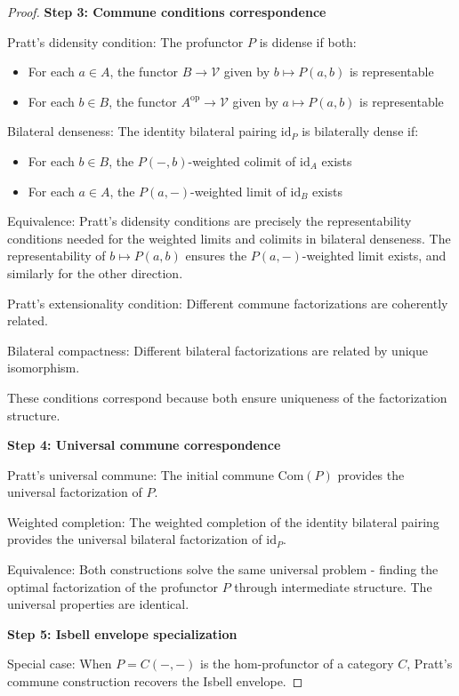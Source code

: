 \documentclass[11pt]{article}
\theoremstyle{plain}
\theoremstyle{definition}
\theoremstyle{remark}
\newcommand{\V}{\mathcal{V}}
\newcommand{\op}{\mathrm{op}}
\begin{document}
\begin{proof}
\textbf{Step 3: Commune conditions correspondence}

Pratt's didensity condition: The profunctor $P$ is didense if both:
\begin{itemize}
\item For each $a \in A$, the functor $B \to \V$ given by $b \mapsto P(a, b)$ is representable
\item For each $b \in B$, the functor $A^{\op} \to \V$ given by $a \mapsto P(a, b)$ is representable
\end{itemize}

Bilateral denseness: The identity bilateral pairing $\text{id}_P$ is bilaterally dense if:
\begin{itemize}
\item For each $b \in B$, the $P(-, b)$-weighted colimit of $\text{id}_A$ exists
\item For each $a \in A$, the $P(a, -)$-weighted limit of $\text{id}_B$ exists
\end{itemize}

Equivalence: Pratt's didensity conditions are precisely the representability conditions needed for the weighted limits and colimits in bilateral denseness. The representability of $b \mapsto P(a, b)$ ensures the $P(a, -)$-weighted limit exists, and similarly for the other direction.

Pratt's extensionality condition: Different commune factorizations are coherently related.

Bilateral compactness: Different bilateral factorizations are related by unique isomorphism.

These conditions correspond because both ensure uniqueness of the factorization structure.

\textbf{Step 4: Universal commune correspondence}

Pratt's universal commune: The initial commune $\text{Com}(P)$ provides the universal factorization of $P$.

Weighted completion: The weighted completion of the identity bilateral pairing provides the universal bilateral factorization of $\text{id}_P$.

Equivalence: Both constructions solve the same universal problem - finding the optimal factorization of the profunctor $P$ through intermediate structure. The universal properties are identical.

\textbf{Step 5: Isbell envelope specialization}

Special case: When $P = C(-, -)$ is the hom-profunctor of a category $C$, Pratt's commune construction recovers the Isbell envelope.


\end{proof}
\end{document}
